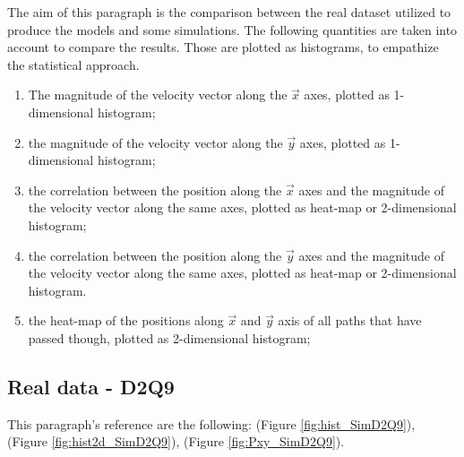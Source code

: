 \documentclass[class=article, crop=false]{standalone}
\begin{document}
The aim of this paragraph is the comparison between the real dataset utilized to produce the models and some simulations.
The following quantities are taken into account to compare the results.
Those are plotted as histograms, to empathize the statistical approach.
\begin{enumerate}[label=(\roman*)]
\item The magnitude of the velocity vector along the $\vec x$ axes, plotted as 1-dimensional histogram;
\item the magnitude of the velocity vector along the $\vec y$ axes, plotted as 1-dimensional histogram;
\item the correlation between the position along the $\vec x$ axes and the magnitude of the velocity vector along the same axes, plotted as heat-map or 2-dimensional histogram;
\item the correlation between the position along the $\vec y$ axes and the magnitude of the velocity vector along the same axes, plotted as heat-map or 2-dimensional histogram.
\item the heat-map of the positions along $\vec x$ and $\vec y$ axis of all paths that have passed though, plotted as 2-dimensional histogram;
\end{enumerate}

\FloatBarrier
\subsection{Real data - D2Q9}
This paragraph's reference are the following: (Figure \ref{fig:hist_SimD2Q9}), (Figure \ref{fig:hist2d_SimD2Q9}), (Figure \ref{fig:Pxy_SimD2Q9}).
\end{document}
